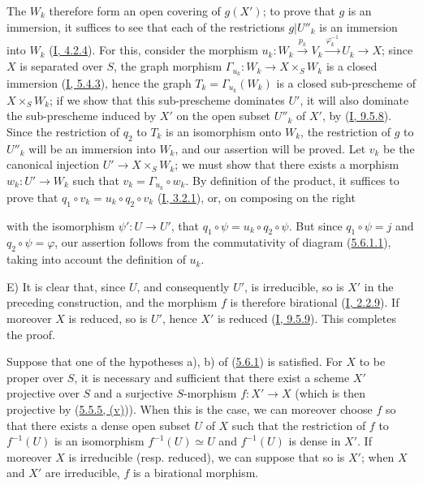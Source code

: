 The $W_k$ therefore form an open covering of $g(X')$; to prove that
$g$ is an immersion, it suffices to see that each of the restrictions
$g|U''_k$ is an immersion into $W_k$
(\hyperref[I.4.2.4]{I, 4.2.4}). For this, consider the morphism
$u_k:W_k\xrightarrow{p_k}V_k\xrightarrow{\varphi_k^{-1}}U_k\to X$; since
$X$ is separated over $S$, the graph morphism
$\Gamma_{u_k}:W_k\to X\times_SW_k$ is a closed immersion
(\hyperref[I.5.4.3]{I, 5.4.3}), hence the graph
$T_k=\Gamma_{u_k}(W_k)$ is a closed sub-prescheme of $X\times_SW_k$; if
we show that this sub-prescheme dominates $U'$, it will also dominate the
sub-prescheme induced by $X'$ on the open subset $U''_k$ of $X'$, by
(\hyperref[I.9.5.8]{I, 9.5.8}). Since the restriction of $q_2$ to $T_k$
is an isomorphism onto $W_k$, the restriction of $g$ to $U''_k$ will be an
immersion into $W_k$, and our assertion will be proved. Let $v_k$ be the
canonical injection $U'\to X\times_SW_k$; we must show that there exists a
morphism $w_k:U'\to W_k$ such that $v_k=\Gamma_{u_k}\circ w_k$. By
definition of the product, it suffices to prove that
$q_1\circ v_k=u_k\circ q_2\circ v_k$
(\hyperref[I.3.2.1]{I, 3.2.1}), or, on composing on the right


with the isomorphism $\psi':U\to U'$, that
$q_1\circ\psi=u_k\circ q_2\circ\psi$. But since $q_1\circ\psi=j$ and
$q_2\circ\psi=\varphi$, our assertion follows from the commutativity of
diagram (\hyperref[II.5.6.1.1]{5.6.1.1}), taking into account the
definition of $u_k$.

E) It is clear that, since $U$, and consequently $U'$, is irreducible, so is
$X'$ in the preceding construction, and the morphism $f$ is therefore
birational (\hyperref[I.2.2.9]{I, 2.2.9}). If moreover $X$ is reduced, so
is $U'$, hence $X'$ is reduced
(\hyperref[I.9.5.9]{I, 9.5.9}). This completes the proof.

\begin{corollary}[5.6.2]
\label{II.5.6.2}
Suppose that one of the hypotheses a), b) of
(\hyperref[II.5.6.1]{5.6.1}) is satisfied. For $X$ to be proper over $S$,
it is necessary and sufficient that there exist a scheme $X'$ projective over
$S$ and a surjective $S$-morphism $f:X'\to X$ (which is then projective by
(\hyperref[II.5.5.5]{5.5.5, (v)})). When this is the case, we can
moreover choose $f$ so that there exists a dense open subset $U$ of $X$ such
that the restriction of $f$ to $f^{-1}(U)$ is an isomorphism
$f^{-1}(U)\simeq U$ and $f^{-1}(U)$ is dense in $X'$. If moreover $X$
is irreducible (resp. reduced), we can suppose that so is $X'$; when $X$
and $X'$ are irreducible, $f$ is a birational morphism.
\end{corollary}

